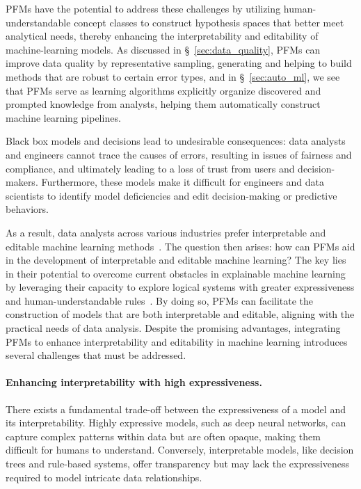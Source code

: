   
  PFMs have the potential to address these challenges by utilizing human-understandable concept classes to construct hypothesis spaces that better meet analytical needs, thereby enhancing the interpretability and editability of machine-learning models. As discussed in \S~\ref{sec:data_quality}, PFMs can improve data quality by representative sampling, generating and helping to build methods that are robust to certain error types, and in \S~\ref{sec:auto_ml}, we see that PFMs serve as learning algorithms explicitly organize discovered and prompted knowledge from analysts, helping them automatically construct machine learning pipelines.
  
  Black box models and decisions lead to undesirable consequences: data analysts and engineers cannot trace the causes of errors, resulting in issues of fairness and compliance, and ultimately leading to a loss of trust from users and decision-makers. Furthermore, these models make it difficult for engineers and data scientists to identify model deficiencies and edit decision-making or predictive behaviors.
  
  As a result, data analysts across various industries prefer interpretable and editable machine learning methods~\cite{vertsel2024hybrid,gerussi2022llm,Zhang2024LargeLM,truhn2023large}. The question then arises: how can PFMs aid in the development of interpretable and editable machine learning? The key lies in their potential to overcome current obstacles in explainable machine learning by leveraging their capacity to explore logical systems with greater expressiveness and human-understandable rules~\cite{reizingerposition}. By doing so, PFMs can facilitate the construction of models that are both interpretable and editable, aligning with the practical needs of data analysis. Despite the promising advantages, integrating PFMs to enhance interpretability and editability in machine learning introduces several challenges that must be addressed.
  
  \paragraph{Enhancing interpretability with high expressiveness.}
  
  There exists a fundamental trade-off between the expressiveness of a model and its interpretability. Highly expressive models, such as deep neural networks, can capture complex patterns within data but are often opaque, making them difficult for humans to understand. Conversely, interpretable models, like decision trees and rule-based systems, offer transparency but may lack the expressiveness required to model intricate data relationships.
  
